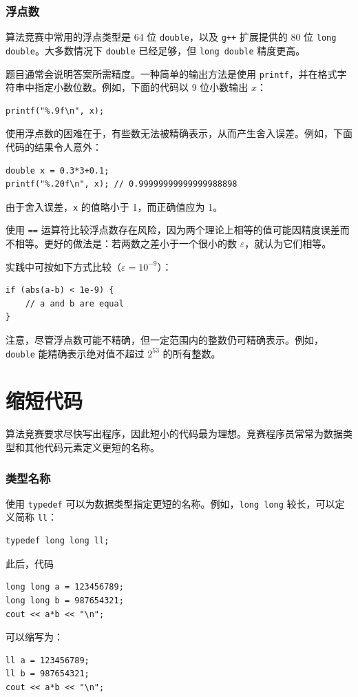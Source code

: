 \subsubsection{浮点数}


算法竞赛中常用的浮点类型是 64 位 \texttt{double}，以及 \texttt{g++} 扩展提供的 80 位 \texttt{long double}。大多数情况下 \texttt{double} 已经足够，但 \texttt{long double} 精度更高。

题目通常会说明答案所需精度。一种简单的输出方法是使用 \texttt{printf}，并在格式字符串中指定小数位数。例如，下面的代码以 9 位小数输出 $x$：

\begin{lstlisting}
printf("%.9f\n", x);
\end{lstlisting}

使用浮点数的困难在于，有些数无法被精确表示，从而产生舍入误差。例如，下面代码的结果令人意外：

\begin{lstlisting}
double x = 0.3*3+0.1;
printf("%.20f\n", x); // 0.99999999999999988898
\end{lstlisting}

由于舍入误差，\texttt{x} 的值略小于 1，而正确值应为 1。

使用 \texttt{==} 运算符比较浮点数存在风险，因为两个理论上相等的值可能因精度误差而不相等。更好的做法是：若两数之差小于一个很小的数 $\varepsilon$，就认为它们相等。

实践中可按如下方式比较（$\varepsilon=10^{-9}$）：

\begin{lstlisting}
if (abs(a-b) < 1e-9) {
    // a and b are equal
}
\end{lstlisting}

注意，尽管浮点数可能不精确，但一定范围内的整数仍可精确表示。例如，\texttt{double} 能精确表示绝对值不超过 $2^{53}$ 的所有整数。

\section{缩短代码}

算法竞赛要求尽快写出程序，因此短小的代码最为理想。竞赛程序员常常为数据类型和其他代码元素定义更短的名称。

\subsubsection{类型名称}
使用 \texttt{typedef} 可以为数据类型指定更短的名称。例如，\texttt{long long} 较长，可以定义简称 \texttt{ll}：
\begin{lstlisting}
typedef long long ll;
\end{lstlisting}
此后，代码
\begin{lstlisting}
long long a = 123456789;
long long b = 987654321;
cout << a*b << "\n";
\end{lstlisting}
可以缩写为：
\begin{lstlisting}
ll a = 123456789;
ll b = 987654321;
cout << a*b << "\n";
\end{lstlisting}

